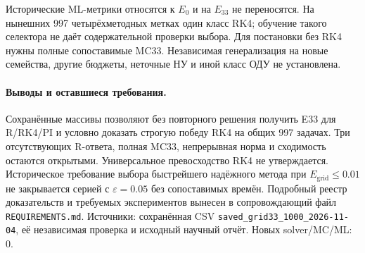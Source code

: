 Исторические ML-метрики относятся к $E_0$ и на $E_{33}$ не переносятся.
На нынешних 997 четырёхметодных метках один класс RK4; обучение такого
селектора не даёт содержательной проверки выбора. Для постановки без
RK4 нужны полные сопоставимые MC33. Независимая генерализация на новые
семейства, другие бюджеты, неточные НУ и иной класс ОДУ не установлена.

\paragraph{Выводы и оставшиеся требования.}
Сохранённые массивы позволяют без повторного решения получить E33
для R/RK4/PI и условно доказать строгую победу RK4 на общих 997 задачах.
Три отсутствующих R-ответа, полная MC33, непрерывная норма и сходимость
остаются открытыми. Универсальное превосходство RK4 не утверждается.
Историческое требование выбора быстрейшего надёжного метода при
$E_{\mathrm{grid}}\le0.01$ не закрывается серией с $\varepsilon=0.05$
без сопоставимых времён. Подробный реестр доказательств и требуемых
экспериментов вынесен в сопровождающий файл \texttt{REQUIREMENTS.md}.
Источники: сохранённая CSV \texttt{saved\_grid33\_1000\_2026-11-04},
её независимая проверка и исходный научный отчёт. Новых solver/MC/ML: 0.
